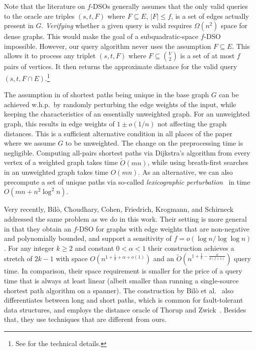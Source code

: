 \documentclass{theoretics}
\newcommand*{\Otilde}{\widetilde{O}}
\renewcommand{\le}{\leqslant}
\renewcommand{\ge}{\geqslant}
\begin{document}
Note that the literature on $f$-DSOs generally assumes that the only valid queries
to the oracle are triples $(s,t,F)$ where $F \subseteq E$, $|F| \le f$, is a set of edges
actually present in $G$.
\emph{Verifying} whether a given query is valid requires $\Omega(n^2)$ space for dense graphs.
This would make the goal of a subquadratic-space $f$-DSO impossible.
However, our query algorithm never uses the assumption $F \subseteq E$.
This allows it to process any triplet $(s,t,F)$ 
where $F \subseteq \binom{V}{2}$ is a set of at most $f$ pairs of vertices.
It then returns the approximate distance for the valid query~$(s,t, F \cap E)$.\footnote{
	See  for the technical details.
}

The assumption in  of shortest paths being unique
in the base graph $G$ can be achieved w.h.p.\ by randomly perturbing the edge weights of the input,
while keeping the characteristics of an essentially unweighted graph.
For an unweighted graph, this results in edge weights of $1 \pm o(1/n)$
not affecting the graph distances.
This is a sufficient alternative condition in all places of the paper
where we assume $G$ to be unweighted.
The change on the preprocessing time is negligible.
Computing all-pairs shortest paths via Dijkstra's algorithm from every vertex of a weighted graph
takes time $\Otilde(mn)$, while using breath-first searches 
in an unweighted graph takes time $O(mn)$.
As an alternative,
we can also precompute a set of unique paths via so-called 
\emph{lexicographic perturbation}~\cite{CaChEr13} in time $O(mn + n^2 \log^2 n)$.

Very recently, Bilò, Choudhary, Cohen, Friedrich, Krogmann, and Schirneck~\cite{Bilo23CompactDOLargeSensitivity} addressed the same problem as we do in this work.
Their setting is more general in that they obtain an $f$-DSO for graphs with 
edge weights that are non-negative and polynomially bounded,
and support a sensitivity of $f = o(\log n/\log\log n)$.
For any integer $k \ge 2$ and constant \mbox{$0 < \alpha < 1$}
their construction achieves a stretch of $2k-1$ with space $O(n^{1+\frac{1}{k}+\alpha+o(1)})$
and an $\Otilde(n^{1+\frac{1}{k}-\frac{\alpha}{k(f+1)}})$ query time.
In comparison, their space requirement is smaller for the price of a query time that is always
at least linear (albeit smaller than running a single-source shortest path algorithm on a spanner).
The construction by Bilò et al.~\cite{Bilo23CompactDOLargeSensitivity} also differentiates between long and short paths, which is common for fault-tolerant data structures, 
and employs the distance oracle of Thorup and Zwick~\cite{ThorupZ05}.
Besides that, they use techniques that are different from ours.
\end{document}
